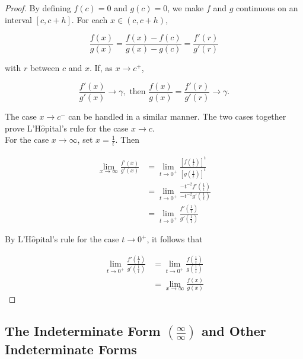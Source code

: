         \begin{proof}
            By defining $f(c) = 0$ and $g(c) = 0$, we make $f$ and $g$ continuous on an interval $[c, c+h]$. For each $x\in (c, c+h)$,

            \[
                \frac{f(x)}{g(x)} = \frac{f(x) - f(c)}{g(x) - g(c)} = \frac{f'(r)}{g'(r)}
            \]

            with $r$ between $c$ and $x$. If, as $x\to c^+$,

            \[
                \frac{f'(x)}{g'(x)}\to \gamma, \text{ then } \frac{f(x)}{g(x)} = \frac{f'(r)}{g'(r)} \to \gamma.
            \]

            The case $x\to c^-$ can be handled in a similar manner. The two cases together prove L'H$\hat{o}$pital's rule for the case $x\to c$. \\

            For the case $x\to \infty$, set $x = \frac{1}{t}$. Then

            \begin{align*}
                \lim_{x\to \infty} \frac{f'(x)}{g'(x)}  &= \lim_{t\to 0^+} \frac{\left[f\left(\frac{1}{t}\right)\right]^t}{\left[g\left(\frac{1}{t}\right)\right]^t} \\
                                                        &= \lim_{t\to 0^+} \frac{-t^{-2}f'\left(\frac{1}{t}\right)}{-t^{-2}g'\left(\frac{1}{t}\right)} \\
                                                        &= \lim_{t\to 0^+} \frac{f'\left(\frac{1}{t}\right)}{g'\left(\frac{1}{t}\right)}
            \end{align*}

            By L'H$\hat{o}$pital's rule for the case $t\to 0^+$, it follows that

            \begin{align*}
                \lim_{t\to 0^+} \frac{f'\left(\frac{1}{t}\right)}{g'\left(\frac{1}{t}\right)}   &= \lim_{t\to 0^+} \frac{f\left(\frac{1}{t}\right)}{g\left(\frac{1}{t}\right)} \\
                                                                                                &= \lim_{x\to\infty} \frac{f(x)}{g(x)}
            \end{align*}
        \end{proof}

    \subsection{The Indeterminate Form $\left(\frac{\infty}{\infty}\right)$ and Other Indeterminate Forms}      %

